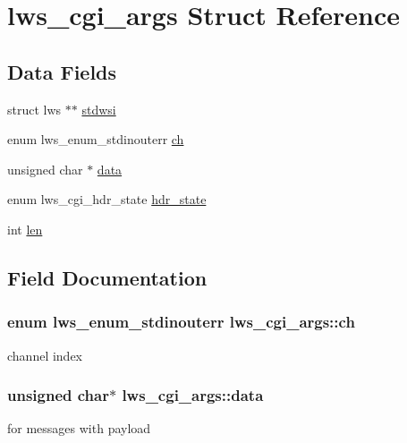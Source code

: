 \hypertarget{structlws__cgi__args}{}\section{lws\+\_\+cgi\+\_\+args Struct Reference}
\label{structlws__cgi__args}
\subsection*{Data Fields}
\begin{DoxyCompactItemize}
\item 
struct lws $\ast$$\ast$ \hyperlink{structlws__cgi__args_a4ccc1058e7e914a26eef31ab2ad46aa1}{stdwsi}
\item 
enum lws\+\_\+enum\+\_\+stdinouterr \hyperlink{structlws__cgi__args_adeee220b29aeacc34632c38e50f0f5a5}{ch}
\item 
unsigned char $\ast$ \hyperlink{structlws__cgi__args_a8ac842084688c02f3f94694ef700d8f7}{data}
\item 
enum lws\+\_\+cgi\+\_\+hdr\+\_\+state \hyperlink{structlws__cgi__args_a741c11b9aa05997ec45a3400d7fb7739}{hdr\+\_\+state}
\item 
int \hyperlink{structlws__cgi__args_a36e5c256433c187bd0eaa9c1ca667f1d}{len}
\end{DoxyCompactItemize}


\subsection{Field Documentation}
\subsubsection[{\texorpdfstring{ch}{ch}}]{\setlength{\rightskip}{0pt plus 5cm}enum lws\+\_\+enum\+\_\+stdinouterr lws\+\_\+cgi\+\_\+args\+::ch}\hypertarget{structlws__cgi__args_adeee220b29aeacc34632c38e50f0f5a5}{}\label{structlws__cgi__args_adeee220b29aeacc34632c38e50f0f5a5}
channel index 
\subsubsection[{\texorpdfstring{data}{data}}]{\setlength{\rightskip}{0pt plus 5cm}unsigned char$\ast$ lws\+\_\+cgi\+\_\+args\+::data}\hypertarget{structlws__cgi__args_a8ac842084688c02f3f94694ef700d8f7}{}\label{structlws__cgi__args_a8ac842084688c02f3f94694ef700d8f7}
for messages with payload 
